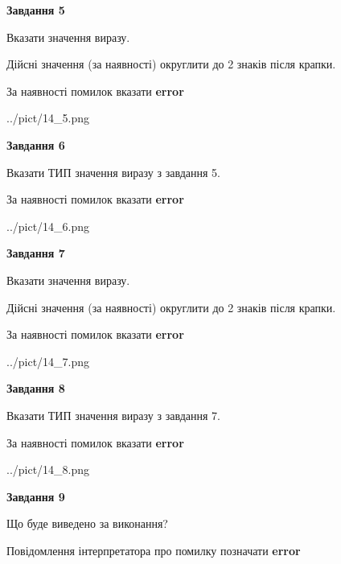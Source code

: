 \documentclass[11pt, ukrainian]{article}
\begin{document}
{\begin {large}
{\begin {center}\textbf{Завдання 5}\end {center}}\par
Вказати значення виразу. \par
Дійсні значення (за наявності) округлити до 2 знаків після крапки. \par
За наявності помилок вказати \textbf{error}

\begin{center}
	{../pict/14_5.png}
\end{center}
\newpage

{\begin {center}\textbf{Завдання 6}\end {center}}\par
Вказати ТИП значення виразу з завдання 5. \par
За наявності помилок вказати \textbf{error}

\begin{center}
	{../pict/14_6.png}
\end{center}
\newpage

{\begin {center}\textbf{Завдання 7}\end {center}}\par
Вказати значення виразу. \par
Дійсні значення (за наявності) округлити до 2 знаків після крапки. \par
За наявності помилок вказати \textbf{error}

\begin{center}
	{../pict/14_7.png}
\end{center}
\newpage

{\begin {center}\textbf{Завдання 8}\end {center}}\par
Вказати ТИП значення виразу з завдання 7. \par
За наявності помилок вказати \textbf{error}

\begin{center}
	{../pict/14_8.png}
\end{center}
\newpage

{\begin {center}\textbf{Завдання 9}\end {center}}\par
Що буде виведено за виконання? \par
Повідомлення інтерпретатора про помилку позначати \textbf{error}


\end{large}}
\end{document}
